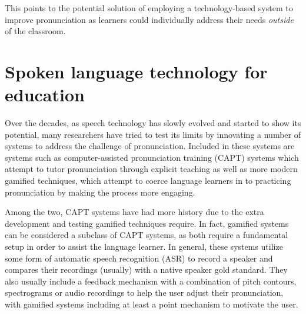 \documentclass
[
    a4paper,
    twoside,
    12pt,
]
{report}
\begin{document}
This points to the potential solution of employing a technology-based
system to improve pronunciation as learners could individually address
their needs \textit{outside} of the classroom.

\hypertarget{spoken-language-technology-for-education}{%
\section{Spoken language technology for
education}\label{spoken-language-technology-for-education}}

Over the decades, as speech technology has slowly evolved and started to
show its potential, many researchers have tried to test its limits by
innovating a number of systems to address the challenge of
pronunciation. Included in these systems are systems such as
computer-assisted pronunciation training (CAPT) systems which attempt to
tutor pronunciation through explicit teaching as well as more modern
gamified techniques, which attempt to coerce language learners in to
practicing pronunciation by making the process more engaging.

Among the two, CAPT systems have had more history due to the extra
development and testing gamified techniques require. In fact, gamified
systems can be considered a subclass of CAPT systems, as both require a
fundamental setup in order to assist the language learner. In general,
these systems utilize some form of automatic speech recognition (ASR) to
record a speaker and compares their recordings (usually) with a native
speaker gold standard. They also usually include a feedback mechanism
with a combination of pitch contours, spectrograms or audio recordings
to help the user adjust their pronunciation, with gamified systems
including at least a point mechanism to motivate the user.
\end{document}
